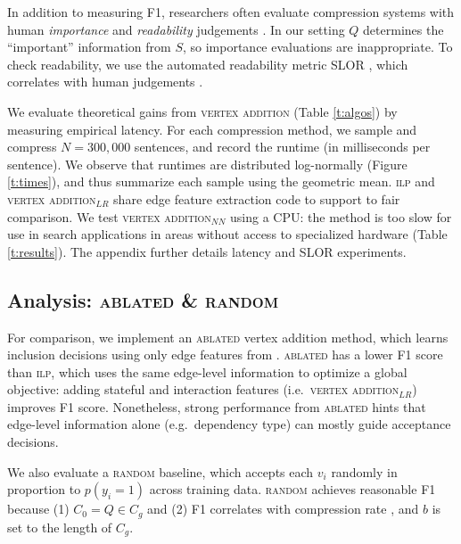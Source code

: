 \documentclass[11pt,a4paper]{article}
\begin{document}
{In addition to measuring F1, researchers often evaluate compression systems with human \textit{importance} and \textit{readability} judgements \cite{Knight2000StatisticsBasedS,filippova2015sentence}. In our setting $Q$ determines the ``important'' information from $S$, so importance evaluations are inappropriate. To check readability, we use the automated readability metric SLOR \cite{lau2015unsupervised}, which correlates with human judgements \cite{kannConl}. 

We evaluate theoretical gains from \textsc{vertex addition}  (Table \ref{t:algos}) by measuring empirical latency. For each compression method, we sample and compress $N=300,000$ sentences, and record the runtime (in milliseconds per sentence). We observe that runtimes are distributed log-normally (Figure \ref{t:times}), and thus summarize each sample using the geometric mean. \textsc{ilp} and \textsc{vertex addition}$_{LR}$ share edge feature extraction code to support to fair comparison. We test \textsc{vertex addition}$_{NN}$ using a CPU: the method is too slow for use in search applications in areas without access to specialized hardware (Table \ref{t:results}). The appendix further details latency and SLOR experiments.

\subsection{Analysis:  \textsc{ablated} \& \textsc{random}}\label{s:ablated}
For comparison, we implement an \textsc{ablated} vertex addition method, which learns inclusion decisions using only edge features from \citet{filippova2013overcoming}. \textsc{ablated} has a lower F1 score than \textsc{ilp}, which uses the same edge-level information to optimize a global objective: adding stateful and interaction features (i.e.\ \textsc{vertex addition}$_{LR}$) improves F1 score. Nonetheless, strong performance from \textsc{ablated} hints that edge-level information alone (e.g.\ dependency type) can mostly guide acceptance decisions.

We also evaluate a \textsc{random} baseline, which accepts each $v_i$ randomly in proportion to $p(y_i = 1)$ across training data. \textsc{random} achieves reasonable F1 because (1) $C_0 = Q \in C_g$ and (2) F1 correlates with compression rate \cite{napoles2011evaluating}, and $b$ is set to the length of $C_g$.



}
\end{document}
